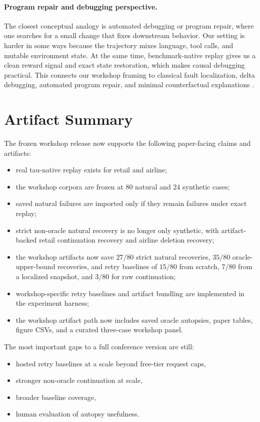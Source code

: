 \documentclass[11pt]{article}
\begin{document}
\paragraph{Program repair and debugging perspective.}
The closest conceptual analogy is automated debugging or program repair, where
one searches for a small change that fixes downstream behavior. Our setting is
harder in some ways because the trajectory mixes language, tool calls, and
mutable environment state. At the same time, benchmark-native replay gives us a
clean reward signal and exact state restoration, which makes causal debugging
practical. This connects our workshop framing to classical fault localization,
delta debugging, automated program repair, and minimal counterfactual
explanations \citep{fault_localization,delta_debugging,program_repair,minimal_counterfactuals}.

\section{Artifact Summary}

The frozen workshop release now supports the following paper-facing claims and
artifacts:
\begin{itemize}
  \item real tau-native replay exists for retail and airline;
  \item the workshop corpora are frozen at $80$ natural and $24$ synthetic
  cases;
  \item saved natural failures are imported only if they remain failures under
  exact replay;
  \item strict non-oracle natural recovery is no longer only synthetic, with
  artifact-backed retail continuation recovery and airline deletion recovery;
  \item the workshop artifacts now save $27/80$ strict natural
  recoveries, $35/80$ oracle-upper-bound recoveries, and retry baselines of
  $15/80$ from scratch, $7/80$ from a localized snapshot, and $3/80$ for raw
  continuation;
  \item workshop-specific retry baselines and artifact bundling are implemented
  in the experiment harness;
  \item the workshop artifact path now includes saved oracle autopsies, paper
  tables, figure CSVs, and a curated three-case workshop panel.
\end{itemize}

The most important gaps to a full conference version are still:
\begin{itemize}
  \item hosted retry baselines at a scale beyond free-tier request caps,
  \item stronger non-oracle continuation at scale,
  \item broader baseline coverage,
  \item human evaluation of autopsy usefulness.
\end{itemize}
\end{document}
